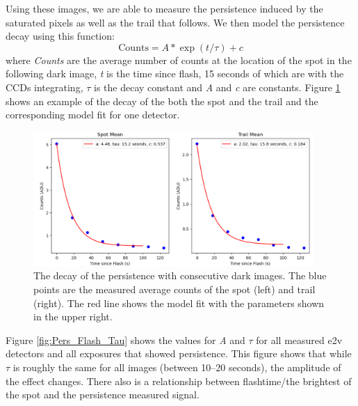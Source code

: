 \documentclass[DM,authoryear,toc]{lsstdoc}
\begin{document}
Using these images, we are able to measure the persistence induced by the saturated pixels as well as the trail that follows.
We then model the persistence decay using this function:
\begin{equation*}
  \textrm{Counts}= A * \exp(t/\tau)+c
\end{equation*}
where \textit{Counts} are the average number of counts at the location of the spot in the following dark image, \textit{t} is the time since flash, 15 seconds of which are with the CCDs integrating, \textit{$\tau$} is the decay constant and \textit{A} and \textit{c} are constants.
Figure \ref{fig:Run6_decay} shows an example of the decay of the both the spot and the trail and the corresponding model fit for one detector.

\begin{figure}[!ht]
  \centering
  \includegraphics[width=0.95\textwidth, angle=0]{Run_6_decay.png}
  \caption{
  The decay of the persistence with consecutive dark images. 
  The blue points are the measured average counts of the spot (left) and trail (right).
  The red line shows the model fit with the parameters shown in the upper right.
  }\label{fig:Run6_decay}
\end{figure}

Figure \ref{fig:Pers_Flash_Tau} shows the values for \textit{A} and \textit{$\tau$} for all measured e2v detectors and all exposures that showed persistence. 
This figure shows that while \textit{$\tau$} is roughly the same for all images (between 10--20 seconds), the amplitude of the effect changes.
There also is a relationship between flashtime/the brightest of the spot and the persistence measured signal.
\end{document}
